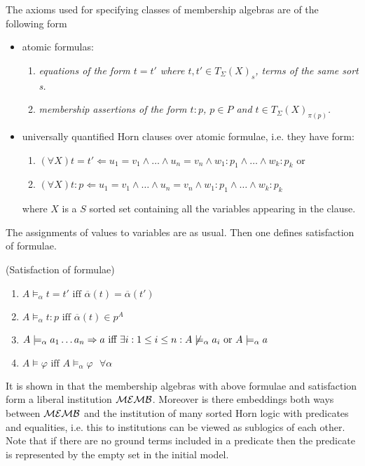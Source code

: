 \documentclass[10pt]{article}
\begin{document}
\begin{definition}
The axioms used for specifying classes of membership algebras are of the following form
\begin{itemize}
\item atomic formulas:
	\begin{enumerate}
	\item \it{equations} of the form $t=t'$ where $t,t' \in T_\Sigma(X)_s$, terms of the same sort s.
	\item \it{membership assertions} of the form  $t:p$, $p \in P$ and $t \in T_\Sigma(X)_{\pi(p)}$.
	\end{enumerate}
\item universally quantified Horn clauses over atomic formulae, i.e. they have form:
	\begin{enumerate}
	\item $(\forall X) t=t' \Leftarrow u_1=v_1 \wedge \ldots \wedge u_n=v_n \wedge w_1:p_1 \wedge \ldots \wedge w_k:p_k$ or
	\item $(\forall X) t:p \Leftarrow u_1=v_1 \wedge \ldots \wedge u_n=v_n \wedge w_1:p_1 \wedge \ldots \wedge w_k:p_k$
	\end{enumerate}
where $X$ is a $S$ sorted set containing all the variables appearing in the clause.
\end{itemize}
\end{definition}
The assignments of values to variables are as usual. Then one defines
satisfaction of formulae.
\begin{definition}(Satisfaction of formulae)
\begin{enumerate}
\item $A \models_\alpha t = t' \mbox{ iff } \overline{\alpha}(t) =\overline{\alpha}(t')$
\item $A \models_\alpha t:p \mbox{ iff } \overline{\alpha}(t) \in p^A$ %
\item $ A \models_\alpha a_1 \ldots a_n \Rightarrow a \mbox{ iff } \exists i: 1 \leq i \leq n : A \not\models_\alpha a_i \mbox{ or }  A \models_\alpha a$
\item $A \models \varphi \mbox{ iff } A \models_\alpha \varphi \mbox{ } \forall \alpha$
\end{enumerate}
\end{definition}
%
It is shown in \cite{member} that the membership algebras with above formulae
and satisfaction form a liberal
institution ${\mathcal{MEMB}}$. Moreover is there embeddings both ways between ${\mathcal{MEMB}}$ and the institution of many sorted Horn logic with predicates and equalities, i.e. this to institutions can be viewed as sublogics of each other. Note that if there are no ground terms included in a
predicate then the predicate is represented by the empty set in the initial
model.
\end{document}
